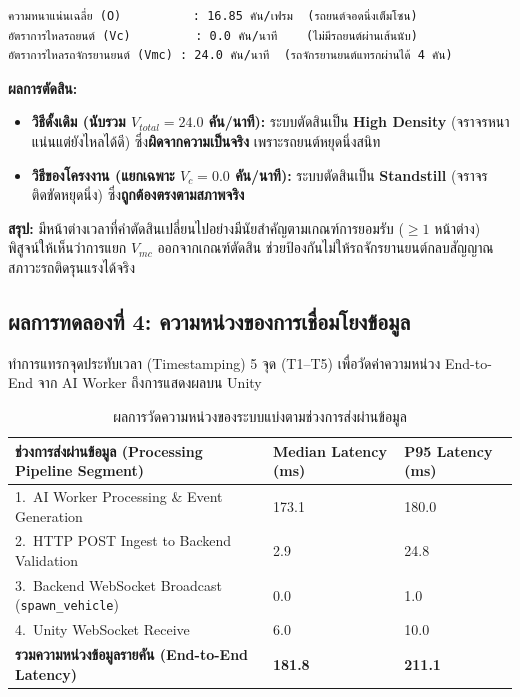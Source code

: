 \documentclass[12pt,a4paper]{report}
\begin{document}
\begin{lstlisting}[caption={ค่าพารามิเตอร์สภาพจราจรช่วงวินาทีที่ 10--20 ในการทดสอบ Experiment 3}]
ความหนาแน่นเฉลี่ย (O)          : 16.85 คัน/เฟรม  (รถยนต์จอดนิ่งเต็มโซน)
อัตราการไหลรถยนต์ (Vc)         : 0.0 คัน/นาที    (ไม่มีรถยนต์ผ่านเส้นนับ)
อัตราการไหลรถจักรยานยนต์ (Vmc) : 24.0 คัน/นาที  (รถจักรยานยนต์แทรกผ่านได้ 4 คัน)
\end{lstlisting}

\noindent\textbf{ผลการตัดสิน:}

\begin{itemize}
  \item \textbf{วิธีดั้งเดิม (นับรวม $V_{total} = 24.0$ คัน/นาที):}
        ระบบตัดสินเป็น \textbf{High Density}
        (จราจรหนาแน่นแต่ยังไหลได้ดี)
        ซึ่ง\textbf{ผิดจากความเป็นจริง} เพราะรถยนต์หยุดนิ่งสนิท

  \item \textbf{วิธีของโครงงาน (แยกเฉพาะ $V_c = 0.0$ คัน/นาที):}
        ระบบตัดสินเป็น \textbf{Standstill}
        (จราจรติดขัดหยุดนิ่ง)
        ซึ่ง\textbf{ถูกต้องตรงตามสภาพจริง}
\end{itemize}

\noindent\textbf{สรุป:}
มีหน้าต่างเวลาที่คำตัดสินเปลี่ยนไปอย่างมีนัยสำคัญตามเกณฑ์การยอมรับ
($\geq 1$ หน้าต่าง)
พิสูจน์ให้เห็นว่าการแยก $V_{mc}$ ออกจากเกณฑ์ตัดสิน
ช่วยป้องกันไม่ให้รถจักรยานยนต์กลบสัญญาณสภาวะรถติดรุนแรงได้จริง

\subsection{ผลการทดลองที่ 4: ความหน่วงของการเชื่อมโยงข้อมูล}
\label{subsec:exp4}

ทำการแทรกจุดประทับเวลา (Timestamping) 5 จุด (T1--T5)
เพื่อวัดค่าความหน่วง End-to-End จาก AI Worker ถึงการแสดงผลบน Unity

\begin{table}[H]
  \centering
  \caption{ผลการวัดความหน่วงของระบบแบ่งตามช่วงการส่งผ่านข้อมูล}
  \label{tab:latency}
  \begin{tabular}{L{8.2cm} C{3.0cm} C{3.0cm}}
    \toprule
    \textbf{ช่วงการส่งผ่านข้อมูล (Processing Pipeline Segment)} &
    \textbf{Median Latency (ms)} &
    \textbf{P95 Latency (ms)} \\
    .\ AI Worker Processing \& Event Generation              & 173.1         & 180.0 \\
    2.\ HTTP POST Ingest to Backend Validation                & 2.9           & 24.8  \\
    3.\ Backend WebSocket Broadcast (\texttt{spawn\_vehicle}) & 0.0           & 1.0   \\
    4.\ Unity WebSocket Receive                               & 6.0           & 10.0  \\
    \midrule
    \textbf{รวมความหน่วงข้อมูลรายคัน (End-to-End Latency)}   & \textbf{181.8} & \textbf{211.1} \\
    \bottomrule
  \end{tabular}
\end{table}
\end{document}
